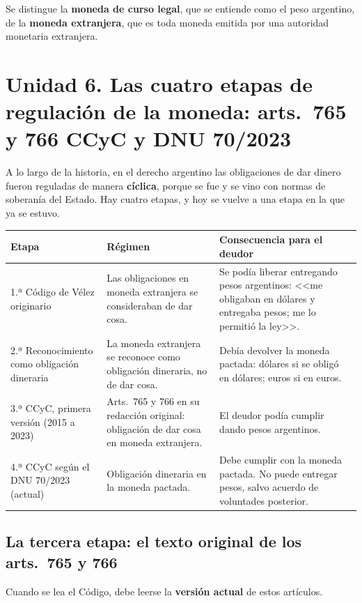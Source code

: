 \documentclass[12pt,oneside,a4paper]{book}
\begin{document}
Se distingue la \textbf{moneda de curso legal}, que se entiende como el peso argentino, de la \textbf{moneda extranjera}, que es toda moneda emitida por una autoridad monetaria extranjera.

\section{Unidad 6. Las cuatro etapas de regulación de la moneda: arts.~765 y 766 CCyC y DNU 70/2023}

A lo largo de la historia, en el derecho argentino las obligaciones de dar dinero fueron reguladas de manera \textbf{cíclica}, porque se fue y se vino con normas de soberanía del Estado. Hay cuatro etapas, y hoy se vuelve a una etapa en la que ya se estuvo.

\begin{longtable}{@{}>{\RaggedRight\arraybackslash}p{}>{\RaggedRight\arraybackslash}p{}>{\RaggedRight\arraybackslash}p{}@{}}
\toprule
\textbf{Etapa} & \textbf{Régimen} & \textbf{Consecuencia para el deudor} \\
\midrule
\endhead
1.ª Código de Vélez originario &
Las obligaciones en moneda extranjera se consideraban de dar cosa. &
Se podía liberar entregando pesos argentinos: <<me obligaban en dólares y entregaba pesos; me lo permitió la ley>>. \\
\addlinespace
2.ª Reconocimiento como obligación dineraria &
La moneda extranjera se reconoce como obligación dineraria, no de dar cosa. &
Debía devolver la moneda pactada: dólares si se obligó en dólares; euros si en euros. \\
\addlinespace
3.ª CCyC, primera versión (2015 a 2023) &
Arts.~765 y 766 en su redacción original: obligación de dar cosa en moneda extranjera. &
El deudor podía cumplir dando pesos argentinos. \\
\addlinespace
4.ª CCyC según el DNU 70/2023 (actual) &
Obligación dineraria en la moneda pactada. &
Debe cumplir con la moneda pactada. No puede entregar pesos, salvo acuerdo de voluntades posterior. \\
\bottomrule
\end{longtable}

\subsection{La tercera etapa: el texto original de los arts.~765 y 766}

Cuando se lea el Código, debe leerse la \textbf{versión actual} de estos artículos.
\end{document}
